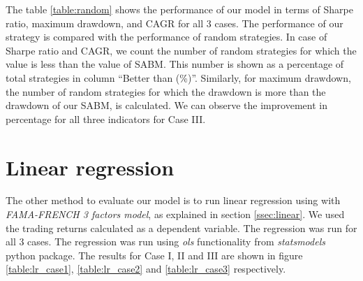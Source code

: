 The table \ref{table:random} shows the performance of our model in terms of Sharpe ratio, maximum drawdown, and CAGR for all 3 cases. The performance of our strategy is compared with the performance of random strategies. In case of Sharpe ratio and CAGR, we count the number of random strategies for which the value is less than the value of SABM. This number is shown as a percentage of total strategies in column ``Better than (\%)''. Similarly, for maximum drawdown, the number of random strategies for which the drawdown is more than the drawdown of our SABM, is calculated. We can observe the improvement in percentage for all three indicators for Case III. 


\section{Linear regression}
The other method to evaluate our model is to run linear regression using with \textit{FAMA-FRENCH 3 factors model}, as explained in section \ref{ssec:linear}.
We used the trading returns calculated as a dependent variable. The regression was run for all 3 cases. The regression was run using \textit{ols} functionality from \textit{statsmodels} python package. The results for Case I, II and III are shown in figure \ref{table:lr_case1}, \ref{table:lr_case2} and \ref{table:lr_case3} respectively.


